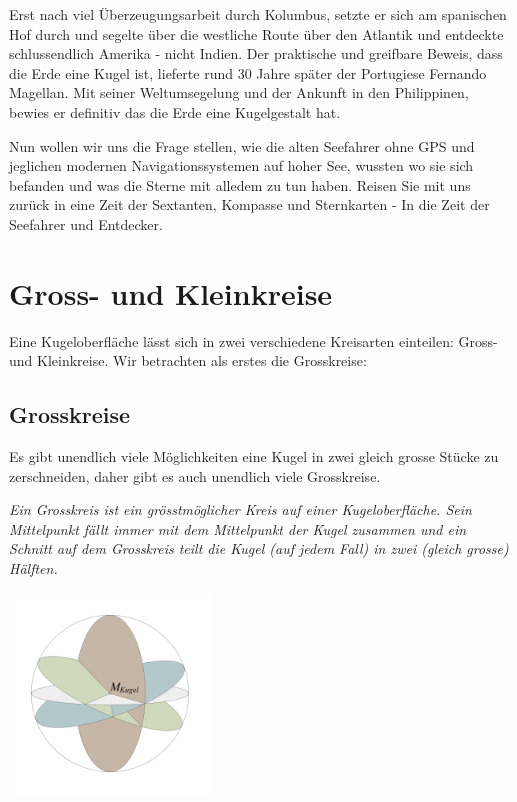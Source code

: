 \begin{refsection}
Erst nach viel Überzeugungsarbeit durch Kolumbus, setzte er sich am spanischen Hof durch und segelte über die westliche Route über den Atlantik und entdeckte schlussendlich Amerika - nicht Indien.
Der praktische und greifbare Beweis, dass die Erde eine Kugel ist, lieferte rund 30 Jahre später der Portugiese Fernando Magellan. Mit seiner Weltumsegelung und der Ankunft in den Philippinen, bewies er definitiv das die Erde eine Kugelgestalt hat.

Nun wollen wir uns die Frage stellen, wie die alten Seefahrer ohne GPS und jeglichen modernen Navigationssystemen auf hoher See, wussten wo sie sich befanden und was die Sterne mit alledem zu tun haben. Reisen Sie mit uns zurück in eine Zeit der Sextanten, Kompasse und Sternkarten - In die Zeit der Seefahrer und Entdecker.



\section{Gross- und Kleinkreise}
Eine Kugeloberfläche lässt sich in zwei verschiedene Kreisarten einteilen: Gross- und Kleinkreise. 
Wir betrachten als erstes die Grosskreise:

\subsection{Grosskreise}
Es gibt unendlich viele Möglichkeiten eine Kugel in zwei gleich grosse Stücke zu zerschneiden, daher gibt es auch unendlich viele Grosskreise.

\begin{definition}
\textit{Ein Grosskreis ist ein grösstmöglicher Kreis auf einer Kugeloberfläche. Sein Mittelpunkt fällt immer mit dem Mittelpunkt der Kugel zusammen und ein Schnitt auf dem Grosskreis teilt die Kugel (auf jedem Fall) in zwei (gleich grosse) Hälften.}
\label{skript:kugel:satz:Grosskreis}
\end{definition}

\begin{center}
        \includegraphics[width=0.4\textwidth]{kugel/Grosskreise.jpg}
\end{center}


\end{refsection}
